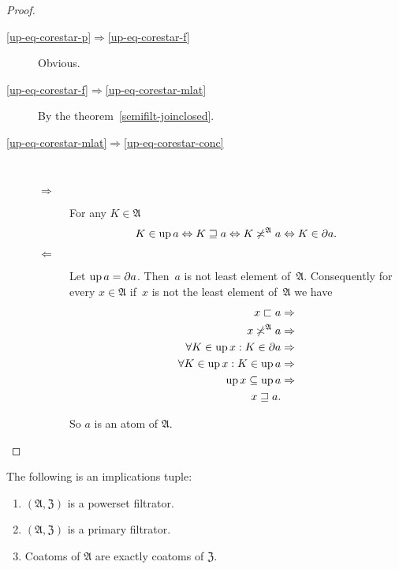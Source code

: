 \begin{proof}
~
\begin{description}
\item [{\ref{up-eq-corestar-p}$\Rightarrow$\ref{up-eq-corestar-f}}] Obvious.
\item [{\ref{up-eq-corestar-f}$\Rightarrow$\ref{up-eq-corestar-mlat}}] By the theorem~\ref{semifilt-joinclosed}.
\item [{\ref{up-eq-corestar-mlat}$\Rightarrow$\ref{up-eq-corestar-conc}}] ~

\begin{description}
\item [{$\Rightarrow$}] For any $K\in\mathfrak{A}$
\[
K\in\operatorname{up} a\Leftrightarrow K\sqsupseteq a\Leftrightarrow K\not\asymp^{\mathfrak{A}}a\Leftrightarrow K\in\partial a.
\]

\item [{$\Leftarrow$}] Let $\operatorname{up} a=\partial a$. Then~$a$ is not
least element of~$\mathfrak{A}$. Consequently
for every $x\in\mathfrak{A}$ if~$x$ is not the least element
of~$\mathfrak{A}$ we have
\begin{align*}
x\sqsubset a & \Rightarrow\\
x\not\asymp^{\mathfrak{A}}a & \Rightarrow\\
\forall K\in\operatorname{up} x:K\in\partial a & \Rightarrow\\
\forall K\in\operatorname{up} x:K\in\operatorname{up} a & \Rightarrow\\
\operatorname{up} x\subseteq\operatorname{up} a & \Rightarrow\\
x\sqsupseteq a.
\end{align*}



So $a$ is an atom of $\mathfrak{A}$.

\end{description}
\end{description}
\end{proof}
\begin{prop}
\label{coat}The following is an implications tuple:
\begin{enumerate}
\item \label{coat-p}$(\mathfrak{A},\mathfrak{Z})$ is a powerset filtrator.
\item \label{coat-fltr}$(\mathfrak{A},\mathfrak{Z})$ is a primary filtrator.
\item \label{coat-conc}Coatoms of $\mathfrak{A}$ are exactly coatoms of
$\mathfrak{Z}$.
\end{enumerate}
\end{prop}
